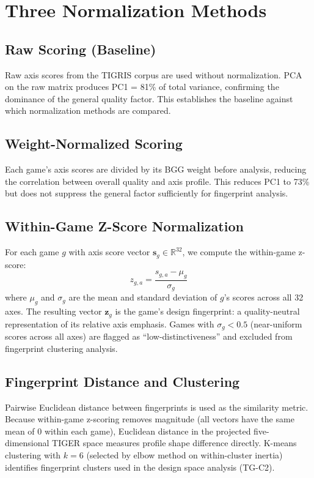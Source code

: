 \section{Three Normalization Methods}
\label{sec:method}

\subsection{Raw Scoring (Baseline)}

Raw axis scores from the TIGRIS corpus are used without normalization. PCA on the raw
matrix produces PC1 = 81\% of total variance, confirming the dominance of the general
quality factor. This establishes the baseline against which normalization methods
are compared.

\subsection{Weight-Normalized Scoring}

Each game's axis scores are divided by its BGG weight before analysis, reducing the
correlation between overall quality and axis profile. This reduces PC1 to 73\% but
does not suppress the general factor sufficiently for fingerprint analysis.

\subsection{Within-Game Z-Score Normalization}

For each game $g$ with axis score vector $\mathbf{s}_g \in \mathbb{R}^{32}$, we compute
the within-game z-score:
\[
  z_{g,a} = \frac{s_{g,a} - \mu_g}{\sigma_g}
\]
where $\mu_g$ and $\sigma_g$ are the mean and standard deviation of $g$'s scores across
all 32 axes. The resulting vector $\mathbf{z}_g$ is the game's design fingerprint:
a quality-neutral representation of its relative axis emphasis. Games with $\sigma_g < 0.5$
(near-uniform scores across all axes) are flagged as ``low-distinctiveness'' and excluded
from fingerprint clustering analysis.

\subsection{Fingerprint Distance and Clustering}

Pairwise Euclidean distance between fingerprints is used as the similarity metric.
Because within-game z-scoring removes magnitude (all vectors have the same mean of 0
within each game), Euclidean distance in the projected five-dimensional TIGER space
measures profile shape difference directly. K-means clustering with $k = 6$ (selected
by elbow method on within-cluster inertia) identifies fingerprint clusters used in
the design space analysis (TG-C2).
